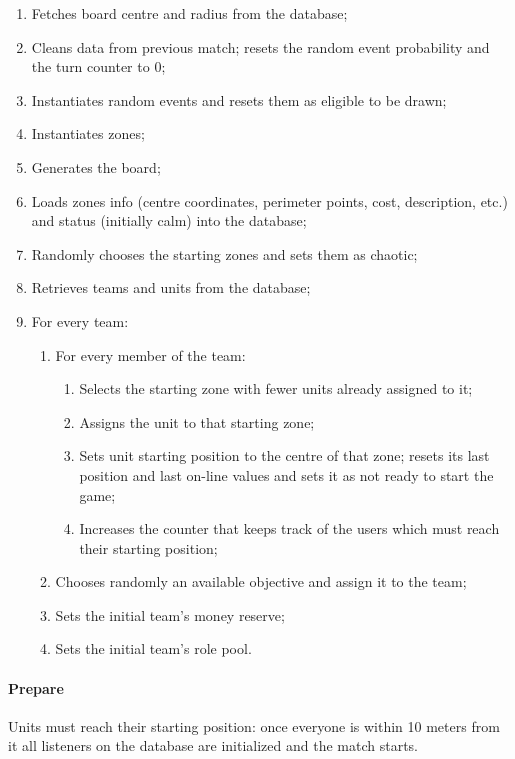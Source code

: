 			\begin{enumerate}
				\item Fetches board centre and radius from the database;
				\item Cleans data from previous match; resets the random event probability and the turn counter to 0;
				\item Instantiates random events and resets them as eligible to be drawn;
				\item Instantiates zones;
				\item Generates the board;
				\item Loads zones info (centre coordinates, perimeter points, cost, description, etc.) and status (initially calm) into the database;
				\item Randomly chooses the starting zones and sets them as chaotic;
				\item Retrieves teams and units from the database;
				\item For every team: 
				\begin{enumerate}					
					\item For every member of the team:
					\begin{enumerate}
						\item Selects the starting zone with fewer units already assigned to it;
						\item Assigns the unit to that starting zone;
						\item Sets unit starting position to the centre of that zone; resets its last position and last on-line values and sets it as not ready to start the game;
						\item Increases the counter that keeps track of the users which must reach their starting position;
					\end{enumerate}
					\item Chooses randomly an available objective and assign it to the team;
					\item Sets the initial team's money reserve;
					\item Sets the initial team's role pool.
				\end{enumerate}
			\end{enumerate}
		
		\paragraph{Prepare}
		
			Units must reach their starting position: once everyone is within 10 meters from it all listeners on the database are initialized and the match starts.
		
